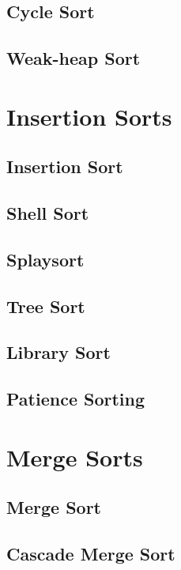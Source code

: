 			\subsection{Cycle Sort}

			\subsection{Weak-heap Sort}

		\section{Insertion Sorts}
			\subsection{Insertion Sort}

			\subsection{Shell Sort}

			\subsection{Splaysort}

			\subsection{Tree Sort}

			\subsection{Library Sort}

			\subsection{Patience Sorting}

		\section{Merge Sorts}
			\subsection{Merge Sort}

			\subsection{Cascade Merge Sort}

